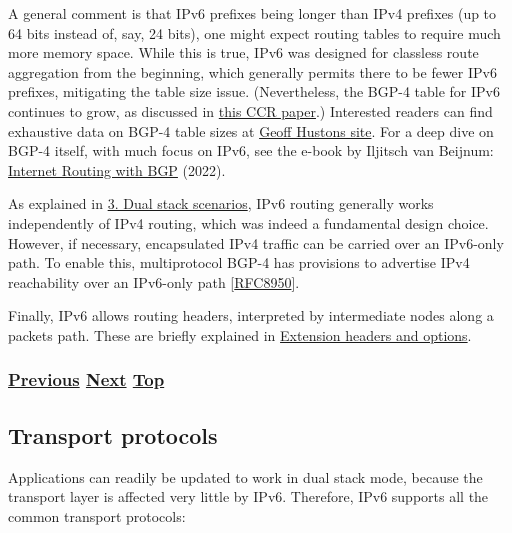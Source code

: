 \documentclass[
]{article}
\begin{document}
A general comment is that IPv6 prefixes being longer than IPv4 prefixes
(up to 64 bits instead of, say, 24 bits), one might expect routing
tables to require much more memory space. While this is true, IPv6 was
designed for classless route aggregation from the beginning, which
generally permits there to be fewer IPv6 prefixes, mitigating the table
size issue. (Nevertheless, the BGP-4 table for IPv6 continues to grow,
as discussed in
\href{https://dl.acm.org/doi/10.1145/3477482.3477490}{this CCR paper}.)
Interested readers can find exhaustive data on BGP-4 table sizes at
\href{https://bgp.potaroo.net/index-bgp.html}{Geoff
Huston\textquotesingle s site}. For a deep dive on BGP-4 itself, with
much focus on IPv6, see the e-book by Iljitsch van Beijnum:
\href{https://www.iljitsch.com/2022/11-18-new-e-book-internet-routing-with-bgp.html}{Internet
Routing with BGP} (2022).

As explained in \hyperref[dual-stack-scenarios]{3. Dual stack
scenarios}, IPv6 routing generally works independently of IPv4 routing,
which was indeed a fundamental design choice. However, if necessary,
encapsulated IPv4 traffic can be carried over an IPv6-only path. To
enable this, multiprotocol BGP-4 has provisions to advertise IPv4
reachability over an IPv6-only path
{[}\href{https://www.rfc-editor.org/info/rfc8950}{RFC8950}{]}.

Finally, IPv6 allows routing headers, interpreted by intermediate nodes
along a packet\textquotesingle s path. These are briefly explained in
\hyperref[extension-headers-and-options]{Extension headers and options}.

\subsubsection{\texorpdfstring{\hyperref[dns]{Previous}
\hyperref[transport-protocols]{Next}
\hyperref[ipv6-basic-technology]{Top}}{Previous Next Top}}\label{previous-next-top-13}

\pagebreak

\subsection{Transport protocols}\label{transport-protocols}

Applications can readily be updated to work in dual stack mode, because
the transport layer is affected very little by IPv6. Therefore, IPv6
supports all the common transport protocols:
\end{document}
